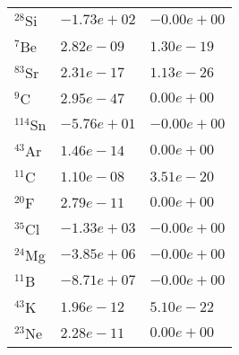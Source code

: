 \begin{tabular}{lll}
 $^{28}$Si  & $-1.73e+02 $                                                       & $-0.00e+00 $                                                                    \\
 $^{7}$Be   & $2.82e-09 $                                                        & $1.30e-19 $                                                                     \\
 $^{83}$Sr  & $2.31e-17 $                                                        & $1.13e-26 $                                                                     \\
 $^{9}$C    & $2.95e-47 $                                                        & $0.00e+00 $                                                                     \\
 $^{114}$Sn & $-5.76e+01 $                                                       & $-0.00e+00 $                                                                    \\
 $^{43}$Ar  & $1.46e-14 $                                                        & $0.00e+00 $                                                                     \\
 $^{11}$C   & $1.10e-08 $                                                        & $3.51e-20 $                                                                     \\
 $^{20}$F   & $2.79e-11 $                                                        & $0.00e+00 $                                                                     \\
 $^{35}$Cl  & $-1.33e+03 $                                                       & $-0.00e+00 $                                                                    \\
 $^{24}$Mg  & $-3.85e+06 $                                                       & $-0.00e+00 $                                                                    \\
 $^{11}$B   & $-8.71e+07 $                                                       & $-0.00e+00 $                                                                    \\
 $^{43}$K   & $1.96e-12 $                                                        & $5.10e-22 $                                                                     \\
 $^{23}$Ne  & $2.28e-11 $                                                        & $0.00e+00 $                                                                     \\

\end{tabular}
